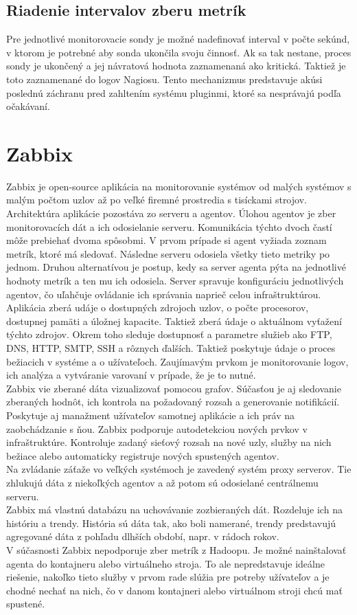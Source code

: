 \documentclass[11pt,final,oneside]{fithesis}
\begin{document}
\subsection{Riadenie intervalov zberu metrík}
Pre jednotlivé monitorovacie sondy je možné nadefinovať interval v počte sekúnd, v ktorom je potrebné aby sonda ukončila svoju činnosť. Ak sa tak nestane, proces sondy je ukončený a jej návratová hodnota
zaznamenaná ako kritická. Taktiež je toto zaznamenané do logov Nagiosu. Tento mechanizmus predstavuje akúsi poslednú záchranu pred zahltením systému pluginmi, ktoré sa nesprávajú podľa očakávaní.

\section{Zabbix}
Zabbix je open-source aplikácia na monitorovanie systémov od malých systémov s malým počtom uzlov až po veľké firemné prostredia s tisíckami strojov. Architektúra aplikácie pozostáva zo serveru a agentov.
Úlohou agentov je zber monitorovacích dát a ich odosielanie serveru. Komunikácia týchto dvoch častí môže prebiehať dvoma spôsobmi. V prvom prípade si agent vyžiada zoznam metrík, ktoré má sledovať. Následne 
serveru odosiela všetky tieto metriky po jednom. Druhou alternatívou je postup, kedy sa server agenta pýta na jednotlivé hodnoty metrík a ten mu ich odosiela. Server spravuje konfiguráciu jednotlivých agentov,
čo uľahčuje ovládanie ich správania naprieč celou infraštruktúrou.
\\Aplikácia zberá udáje o dostupných zdrojoch uzlov, o počte procesorov, dostupnej pamäti a úložnej kapacite. Taktiež zberá údaje o aktuálnom vyťažení týchto zdrojov. Okrem toho sleduje dostupnosť a parametre
služieb ako FTP, DNS, HTTP, SMTP, SSH a rôznych ďalších. Taktiež poskytuje údaje o proces bežiacich v systéme a o užívateľoch. Zaujímavým prvkom je monitorovanie logov, ich analýza a vytváranie varovaní 
v prípade, že je to nutné.
\\Zabbix vie zberané dáta vizualizovať pomocou grafov. Súčasťou je aj sledovanie zberaných hodnôt, ich kontrola na požadovaný rozsah a generovanie notifikácií. Poskytuje aj manažment užívateľov samotnej 
aplikácie a ich práv na zaobchádzanie s ňou. Zabbix podporuje autodetekciou nových prvkov v infraštruktúre. Kontroluje zadaný sieťový rozsah na nové uzly, služby na nich bežiace alebo automaticky registruje
nových spustených agentov.
\\Na zvládanie záťaže vo veľkých systémoch je zavedený systém proxy serverov. Tie zhlukujú dáta z niekoľkých agentov a až potom sú odosielané centrálnemu serveru.
\\Zabbix má vlastnú databázu na uchovávanie zozbieraných dát. Rozdeluje ich na históriu a trendy. História sú dáta tak, ako boli namerané, trendy predstavujú agregované dáta z pohľadu dlhších období, napr. v 
rádoch rokov.
\\V súčasnosti Zabbix nepodporuje zber metrík z Hadoopu. Je možné nainštalovať agenta do kontajneru alebo virtuálneho stroja. To ale nepredstavuje ideálne riešenie, nakoľko tieto služby v prvom rade
slúžia pre potreby užívateľov a je chodné nechať na nich, čo v danom kontajneri alebo virtuálnom stroji chcú mať spustené.
\end{document}
